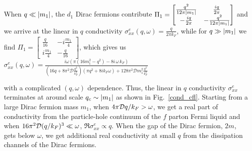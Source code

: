 \documentclass[aps,prl,twocolumn,superscriptaddress,floatfix, 10pt,longbibliography, nofootinbib]{revtex4-2}
\begin{document}
When $q\ll \abs{m_1}$, the $d_1$ Dirac fermions contribute $\Pi_{1}=\begin{bmatrix}
    \frac{q^2}{12\pi \abs{m_1}} & \frac{iq}{2\pi}\\
    -\frac{iq}{2\pi} & -\frac{q^2}{12\pi \abs{m_1}}
    \end{bmatrix}$
and we arrive at the linear in $q$ conductivity $\sigma^e_{xx}(q,\omega)=\frac{q}{2\pi k_F}$, while for $q\gg \abs{m_1}$ we find
$\Pi_{1}=\begin{bmatrix}
    \frac{q}{16} & -i\frac{m_1}{4}\\
    i\frac{m_1}{4} & -\frac{q}{16}
    \end{bmatrix}$,
which gives us $\sigma^e_{xx}(q,\omega)=\frac{i\omega\left(\pi\left(16 m_1^{2}-q^{2}\right)-8 i\,\omega\,k_{F}\right)}
{\left(16 q + 8\pi^2\mathcal{D}\frac{q^2}{k_F^2}\right)(\pi q^2 + 8i k_F\omega) + 128\pi^2 \mathcal{D}m_1^2 \frac{q^2}{k_F^2}} \label{complicated_sigma}$










with a complicated $(q,\omega)$ dependence. Thus, the linear in $q$ conductivity $\sigma^e_{xx}$ terminates at around scale $q_c\sim \abs{m_1}$ as shown in Fig.~\ref{cond_cfl}.
Starting from a large Dirac fermion mass $m_1$, when ${4 \pi {\cal D}} q/k_F >\omega$, we get a real part of conductivity from the particle-hole continuum of the $f$ parton Fermi liquid and when $16\pi^2 {\cal D} (q/k_F)^3\ll \omega$, $\Re\sigma^e_{xx}\propto q$. When the gap of the Dirac fermion, $2m$, gets below $\omega$, we get additional real conductivity at small $q$ from the dissipation channels of the Dirac fermions.
\end{document}
